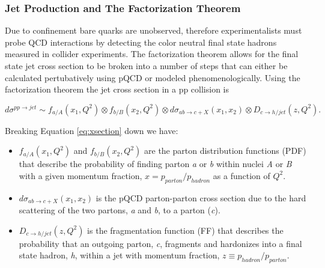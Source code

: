 \subsubsection{Jet Production and The Factorization Theorem}\label{sec:fac}

Due to confinement bare quarks are unobserved, therefore experimentalists must probe QCD interactions by detecting the color neutral final state hadrons measured in collider experiments.  The factorization theorem allows for the final state jet cross section to be broken into a number of steps that can either be calculated pertubatively using pQCD or modeled phenomenologically.  Using the factorization theorem the jet cross section in a pp collision is


\begin{equation}
d\sigma^{pp \rightarrow jet} \sim f_{a/A}(x_{1},Q^{2}) \otimes  f_{b/B}(x_{2},Q^{2}) \otimes d\sigma_{ab \rightarrow c + X} (x_{1},x_{2}) \otimes D_{c \rightarrow h/jet}(z,Q^{2}).
\label{eq:xsection}
\end{equation}

\noindent
Breaking Equation \ref{eq:xsection} down we have:

\begin{itemize}
\item  $ f_{a/A}(x_{1},Q^{2})$ and $ f_{b/B}(x_{2},Q^{2})$ are the parton distribution functions (PDF) that describe the probability of finding parton \textit{a} or \textit{b} within nuclei \textit{A} or \textit{B} with a given momentum fraction, $x = p_{parton} / p_{hadron} $ as a function of $Q^{2}$.
\item  $d\sigma_{ab \rightarrow c + X} (x_{1},x_{2})$ is the pQCD parton-parton cross section due to the hard scattering of the two partons, \textit{a} and \textit{b}, to a parton (\textit{c}).
\item   $ D_{c \rightarrow h/jet}(z,Q^{2})$ is the fragmentation function (FF) that describes the probability that an outgoing parton, \textit{c}, fragments and hardonizes into a final state hadron, \textit{h}, within a jet with momentum fraction, $z \equiv p_{hadron} / p_{parton}$.
\end{itemize}


